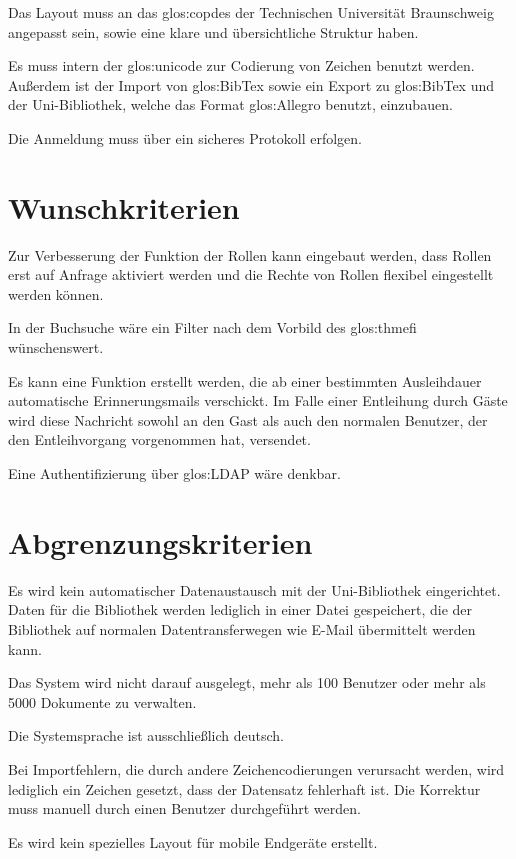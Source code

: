 Das Layout muss an das \gls{glos:copdes} der Technischen Universität Braunschweig angepasst sein, sowie eine klare und übersichtliche Struktur haben. 

Es muss intern der \gls{glos:unicode} zur Codierung von Zeichen benutzt werden. Außerdem ist der Import von \gls{glos:BibTex} sowie ein Export zu \gls{glos:BibTex} und der Uni-Bibliothek, welche das Format \gls{glos:Allegro} benutzt, einzubauen. 

Die Anmeldung muss über ein sicheres Protokoll erfolgen.

\section{Wunschkriterien}
Zur Verbesserung der Funktion der Rollen kann eingebaut werden, dass Rollen erst auf Anfrage aktiviert werden und die Rechte von Rollen flexibel eingestellt werden können. 

In der Buchsuche wäre ein Filter nach dem Vorbild des \gls{glos:thmefi} wünschenswert. 

Es kann eine Funktion erstellt werden, die ab einer bestimmten Ausleihdauer automatische Erinnerungsmails verschickt. Im Falle einer Entleihung durch Gäste wird diese Nachricht sowohl an den Gast als auch den normalen Benutzer, der den Entleihvorgang vorgenommen hat, versendet. 

Eine Authentifizierung über \gls{glos:LDAP} wäre denkbar.

\section{Abgrenzungskriterien}
Es wird kein automatischer Datenaustausch mit der Uni-Bibliothek eingerichtet. Daten für die Bibliothek werden lediglich in einer Datei gespeichert, die der Bibliothek auf normalen Datentransferwegen wie E-Mail übermittelt werden kann. 

Das System wird nicht darauf ausgelegt, mehr als 100 Benutzer oder mehr als 5000 Dokumente zu verwalten.

Die Systemsprache ist ausschließlich deutsch.

Bei Importfehlern, die durch andere Zeichencodierungen verursacht werden, wird lediglich ein Zeichen gesetzt, dass der Datensatz fehlerhaft ist. Die Korrektur muss manuell durch einen Benutzer durchgeführt werden.

Es wird kein spezielles Layout für mobile Endgeräte erstellt.